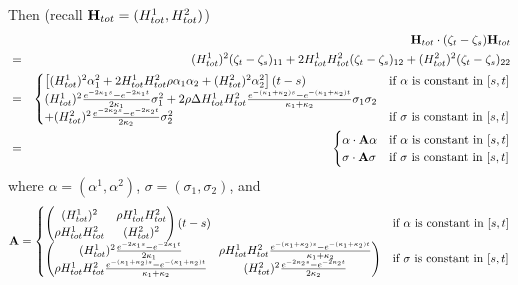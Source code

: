 \documentclass[10pt]{article}
\theoremstyle{plain}
\numberwithin{equation}{section}
\numberwithin{table}{section}
\begin{document}
Then (recall ${\bf H}_{tot}=(H_{tot}^1, H_{tot}^2)$)
\begin{eqnarray*}
& & {\bf H}_{tot}\cdot (\zeta_t - \zeta_s) {\bf H}_{tot} \\
&=& (H^1_{tot})^2(\zeta_t-\zeta_s)_{11} + 2 H^1_{tot}
H^2_{tot}(\zeta_t-\zeta_s)_{12} + (H^2_{tot})^2(\zeta_t-\zeta_s)_{22}
\\
&=&
\begin{cases}
\left[(H_{tot}^1)^2\alpha_1^2 + 2 H_{tot}^1
H_{tot}^2\rho\alpha_1\alpha_2 + (H_{tot}^2)^2\alpha_2^2 \right](t-s) &
\mbox{if $\alpha$ is constant in $[s,t]$} \\
(H_{tot}^1)^2\frac{e^{-2\kappa_1s}-e^{-2\kappa_1t}}{2\kappa_1}\sigma_1^2
+ 2\rho \Delta H_{tot}^1H_{tot}^2 \frac{e^{-(\kappa_1+\kappa_2)s} -
e^{-(\kappa_1+\kappa_2)t}}{\kappa_1+\kappa_2} \sigma_1\sigma_2 & \\
+ (H_{tot}^2)^2\frac{e^{-2\kappa_2s}-e^{-2\kappa_2t}}{2\kappa_2}\sigma_2^2
& \mbox{if $\sigma$ is constant in $[s,t]$}
\end{cases} \\
&=&
\begin{cases}
\alpha\cdot {\bf A} \alpha & \mbox{if $\alpha$ is constant in $[s,t]$} \\
\sigma\cdot {\bf A} \sigma & \mbox{if $\sigma$ is constant in $[s,t]$}
\end{cases} \\
\end{eqnarray*}
where $\alpha = (\alpha^1, \alpha^2)$, $\sigma = (\sigma_1, \sigma_2)$, and
\[
{\bf A} =
\begin{cases}
\left( \begin{matrix}(H_{tot}^1)^2 & \rho H_{tot}^1H_{tot}^2 \\ \rho
H_{tot}^1H_{tot}^2 & (H_{tot}^2)^2\end{matrix} \right)(t-s) & \mbox{if
$\alpha$ is constant in $[s,t]$} \\
\left(\begin{matrix}
(H_{tot}^1)^2\frac{e^{-2\kappa_1s}-e^{-2\kappa_1t}}{2\kappa_1} & \rho
H_{tot}^1H_{tot}^2\frac{e^{-(\kappa_1+\kappa_2)s} -
e^{-(\kappa_1+\kappa_2)t}}{\kappa_1+\kappa_2} \\ \rho
H_{tot}^1H_{tot}^2 \frac{e^{-(\kappa_1+\kappa_2)s} -
e^{-(\kappa_1+\kappa_2)t}}{\kappa_1+\kappa_2} &
(H_{tot}^2)^2\frac{e^{-2\kappa_2s}-e^{-2\kappa_2t}}{2\kappa_2}
\end{matrix} \right) & \mbox{if $\sigma$ is constant in $[s,t]$}
\end{cases}
\]
\end{document}
